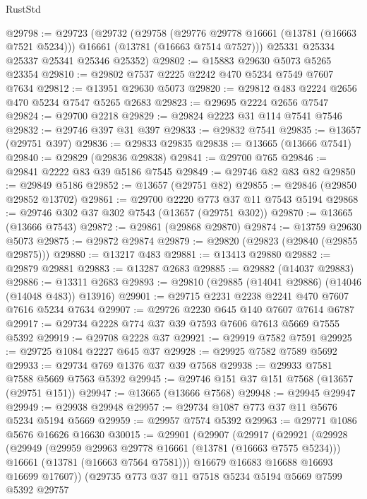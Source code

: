 \begin{lexlean}{RustStd}
\begin{coremodule}
@29798 := @29723
    (@29732
      (@29758
        (@29776 @29778 @16661 (@13781 (@16663 @7521 @5234)))
        @16661
        (@13781 (@16663 @7514 @7527)))
      @25331
      @25334
      @25337
      @25341
      @25346
      @25352)
@29802 := @15883 @29630 @5073 @5265 @23354
@29810 := @29802 @7537 @2225 @2242 @470 @5234 @7549 @7607 @7634
@29812 := @13951 @29630 @5073
@29820 := @29812 @483 @2224 @2656 @470 @5234 @7547 @5265 @2683
@29823 := @29695 @2224 @2656 @7547
@29824 := @29700 @2218
@29829 := @29824 @2223 @31 @114 @7541 @7546
@29832 := @29746 @397 @31 @397
@29833 := @29832 @7541
@29835 := @13657 (@29751 @397)
@29836 := @29833 @29835
@29838 := @13665 (@13666 @7541)
@29840 := @29829 (@29836 @29838)
@29841 := @29700 @765
@29846 := @29841 @2222 @83 @39 @5186 @7545
@29849 := @29746 @82 @83 @82
@29850 := @29849 @5186
@29852 := @13657 (@29751 @82)
@29855 := @29846 (@29850 @29852 @13702)
@29861 := @29700 @2220 @773 @37 @11 @7543 @5194
@29868 := @29746 @302 @37 @302 @7543 (@13657 (@29751 @302))
@29870 := @13665 (@13666 @7543)
@29872 := @29861 (@29868 @29870)
@29874 := @13759 @29630 @5073
@29875 := @29872 @29874
@29879 := @29820 (@29823 (@29840 (@29855 @29875)))
@29880 := @13217 @483
@29881 := @13413 @29880
@29882 := @29879 @29881
@29883 := @13287 @2683
@29885 := @29882 (@14037 @29883)
@29886 := @13311 @2683
@29893 := @29810 (@29885 (@14041 @29886) (@14046 (@14048 @483)) @13916)
@29901 := @29715 @2231 @2238 @2241 @470 @7607 @7616 @5234 @7634
@29907 := @29726 @2230 @645 @140 @7607 @7614 @6787
@29917 := @29734 @2228 @774 @37 @39 @7593 @7606 @7613 @5669 @7555 @5392
@29919 := @29708 @2228 @37
@29921 := @29919 @7582 @7591
@29925 := @29725 @1084 @2227 @645 @37
@29928 := @29925 @7582 @7589 @5692
@29933 := @29734 @769 @1376 @37 @39 @7568
@29938 := @29933 @7581 @7588 @5669 @7563 @5392
@29945 := @29746 @151 @37 @151 @7568 (@13657 (@29751 @151))
@29947 := @13665 (@13666 @7568)
@29948 := @29945 @29947
@29949 := @29938 @29948
@29957 := @29734 @1087 @773 @37 @11 @5676 @5234 @5194 @5669
@29959 := @29957 @7574 @5392
@29963 := @29771 @1086 @5676 @16626 @16630
@30015 := @29901
    (@29907
      (@29917
        (@29921
          (@29928
            (@29949
              (@29959 @29963 @29778 @16661 (@13781 (@16663 @7575 @5234)))
              @16661
              (@13781 (@16663 @7564 @7581)))
            @16679
            @16683
            @16688
            @16693
            @16699
            @17607))
        (@29735
          @773
          @37
          @11
          @7518
          @5234
          @5194
          @5669
          @7599
          @5392
          @29757

\end{coremodule}
\end{lexlean}
